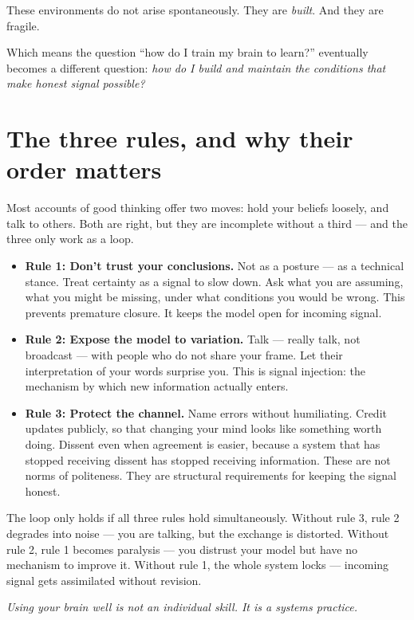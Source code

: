 \documentclass{article}
\begin{document}
These environments do not arise spontaneously. They are \textit{built}. And they are fragile.

Which means the question ``how do I train my brain to learn?'' eventually becomes a different question: \textit{how do I build and maintain the conditions that make honest signal possible?}

\section*{The three rules, and why their order matters}

Most accounts of good thinking offer two moves: hold your beliefs loosely, and talk to others. Both are right, but they are incomplete without a third --- and the three only work as a loop.

\begin{itemize}
    \item \textbf{Rule 1: Don't trust your conclusions.} Not as a posture --- as a technical stance. Treat certainty as a signal to slow down. Ask what you are assuming, what you might be missing, under what conditions you would be wrong. This prevents premature closure. It keeps the model open for incoming signal.
    \item \textbf{Rule 2: Expose the model to variation.} Talk --- really talk, not broadcast --- with people who do not share your frame. Let their interpretation of your words surprise you. This is signal injection: the mechanism by which new information actually enters.
    \item \textbf{Rule 3: Protect the channel.} Name errors without humiliating. Credit updates publicly, so that changing your mind looks like something worth doing. Dissent even when agreement is easier, because a system that has stopped receiving dissent has stopped receiving information. These are not norms of politeness. They are structural requirements for keeping the signal honest.
\end{itemize}

The loop only holds if all three rules hold simultaneously. Without rule 3, rule 2 degrades into noise --- you are talking, but the exchange is distorted. Without rule 2, rule 1 becomes paralysis --- you distrust your model but have no mechanism to improve it. Without rule 1, the whole system locks --- incoming signal gets assimilated without revision.

\textit{Using your brain well is not an individual skill. It is a systems practice.}
\end{document}
